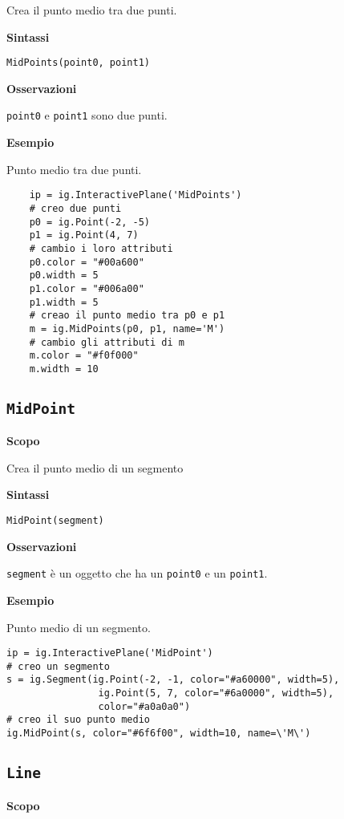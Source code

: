 Crea il punto medio tra due punti.

\textbf{Sintassi}

\begin{lstlisting}
MidPoints(point0, point1)
\end{lstlisting}

\textbf{Osservazioni}

\texttt{point0} e \texttt{point1} sono due punti.

\textbf{Esempio}

Punto medio tra due punti.

\begin{lstlisting}
    ip = ig.InteractivePlane('MidPoints')
    # creo due punti
    p0 = ig.Point(-2, -5)
    p1 = ig.Point(4, 7)
    # cambio i loro attributi
    p0.color = "#00a600"
    p0.width = 5
    p1.color = "#006a00"
    p1.width = 5
    # creao il punto medio tra p0 e p1
    m = ig.MidPoints(p0, p1, name='M')
    # cambio gli attributi di m
    m.color = "#f0f000"
    m.width = 10
\end{lstlisting}


\subsection{\texttt{MidPoint}}
\label{sub:geoint_midpoint}
\textbf{Scopo}

Crea il punto medio di un segmento

\textbf{Sintassi}

\begin{lstlisting}
MidPoint(segment)
\end{lstlisting}

\textbf{Osservazioni}

\texttt{segment} è un oggetto che ha un \texttt{point0} e un \texttt{point1}.

\textbf{Esempio}

Punto medio di un segmento.

\begin{lstlisting}
ip = ig.InteractivePlane('MidPoint')
# creo un segmento
s = ig.Segment(ig.Point(-2, -1, color="#a60000", width=5),
                ig.Point(5, 7, color="#6a0000", width=5), 
                color="#a0a0a0")
# creo il suo punto medio
ig.MidPoint(s, color="#6f6f00", width=10, name=\'M\')
\end{lstlisting}


\subsection{\texttt{Line}}
\label{sub:geoint_line}
\textbf{Scopo}


